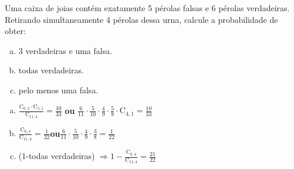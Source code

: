 \begin{ex}
Uma caixa de joias contém exatamente 5 pérolas falsas e 6 pérolas verdadeiras. Retirando simultaneamente 4 pérolas dessa urna, calcule a probabilidade de obter:
   \begin{enumerate}[(a)]
   \item 3 verdadeiras e uma falsa.
   \item todas verdadeiras.
   \item pelo menos uma falsa.
   \end{enumerate}
     \begin{sol}
      \phantom{A} 
       \begin{enumerate} [(a)]
           \item $\frac{\mathrm{C}_{6,3}\cdot \mathrm{C}_{5,1}}{\mathrm{C}_{{11},4}}=\frac{10}{33}$\hspace{0,4cm} \textbf{ou}\hspace{0,4cm} $\frac{6}{11}\cdot\frac{5}{10}\cdot\frac{4}{9}\cdot\frac{5}{8}\cdot \mathrm{C}_{4,1}=\frac{10}{33}$
           \item $\frac{\mathrm{C}_{6,4}}{\mathrm{C}_{{11},4}}=\frac{1}{22}$\hspace{0,4cm}\textbf{ou}\hspace{0,4cm}$\frac{6}{11}\cdot\frac{5}{10}\cdot\frac{4}{9}\cdot\frac{3}{8}=\frac{1}{22}$
           \item (1-todas verdadeiras) $\Longrightarrow 1-\frac{\mathrm{C}_{6,4}}{\mathrm{C}_{{11},4}}=\frac{21}{22}$
           
       \end{enumerate}
     \end{sol}
\end{ex}